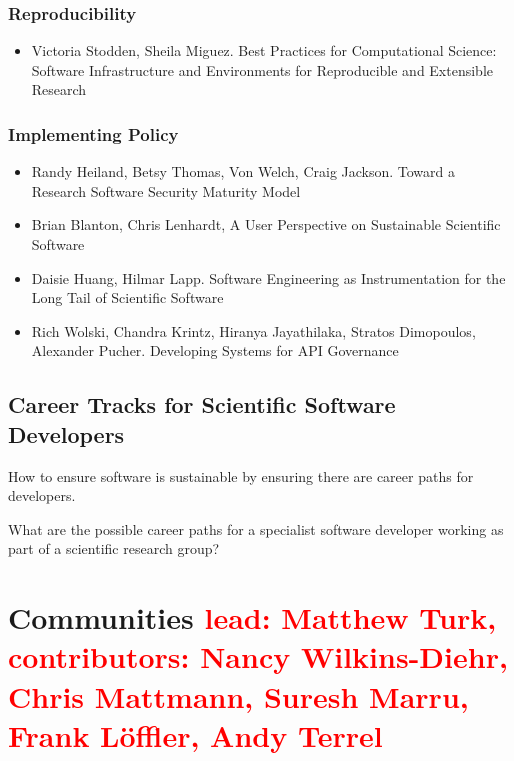 \documentclass[11pt, oneside]{amsart}
\newcommand{\note}[1]{ {\textcolor{red}    { #1 }}}
\begin{document}
\subsubsection*{Reproducibility}

\begin{itemize}

\item Victoria Stodden, Sheila Miguez. Best Practices for
  Computational Science: Software Infrastructure and Environments for
  Reproducible and Extensible Research~\cite{Stodden_WSSSPE}

\end{itemize}

\subsubsection*{Implementing Policy}

\begin{itemize}

\item Randy Heiland, Betsy Thomas, Von Welch, Craig Jackson. Toward a
  Research Software Security Maturity Model~\cite{Heiland_WSSSPE}

\item Brian Blanton, Chris Lenhardt, A User Perspective on Sustainable
  Scientific Software~\cite{Blanton_WSSSPE}

\item Daisie Huang, Hilmar Lapp. Software Engineering as
  Instrumentation for the Long Tail of Scientific Software~\cite{Huang_WSSSPE}

\item Rich Wolski, Chandra Krintz, Hiranya Jayathilaka, Stratos
  Dimopoulos, Alexander Pucher. Developing Systems for API Governance~\cite{Wolski_WSSSPE}

\end{itemize}


\subsection{Career Tracks for Scientific Software Developers}

How to ensure software is sustainable by ensuring there are career
paths for developers.

What are the possible career paths for a specialist software developer working as part of a scientific research group?

\section{Communities \note{lead: Matthew Turk, contributors: Nancy Wilkins-Diehr, Chris Mattmann, Suresh Marru, Frank L\"{o}ffler, Andy Terrel}} \label{sec:community}
\end{document}

